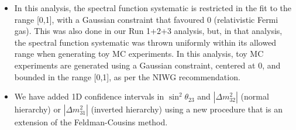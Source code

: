 \begin{itemize}
\item
  In this analysis, the spectral function systematic is restricted in the fit to the range [0,1], with a Gaussian constraint that
  favoured 0 (relativistic Fermi gas).
  This was also done in our Run 1+2+3 analysis, but, in that analysis,
  the spectral function systematic was thrown uniformly within its allowed range when generating toy MC experiments.
  In this analysis, toy MC experiments are generated using a Gaussian constraint, centered at 0, and bounded in the range [0,1],
  as per the NIWG recommendation.
  
\item
We have added 1D confidence intervals in $\sin^2\theta_{23}$ and $|\Delta m^2_{32}|$ (normal hierarchy) or $|\Delta m^2_{31}|$ 
(inverted hierarchy) using a new procedure that is an extension of the Feldman-Cousins method.
\end{itemize}


